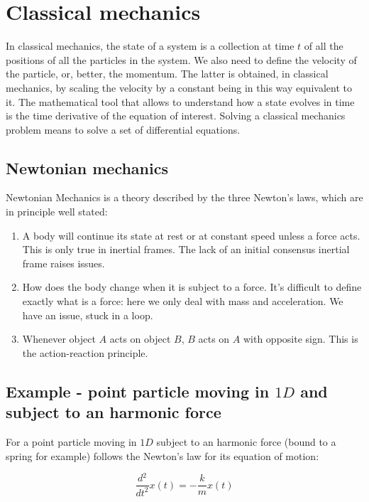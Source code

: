 \section{Classical mechanics}
In classical mechanics, the state of a system is a collection at time $t$ of all the positions of all the particles in the system.
We also need to define the velocity of the particle, or, better, the momentum.
The latter is obtained, in classical mechanics, by scaling the velocity by a constant being in this way equivalent to it.
The mathematical tool that allows to understand how a state evolves in time is the time derivative of the equation of interest.
Solving a classical mechanics problem means to solve a set of differential equations.

  \subsection{Newtonian mechanics}
  Newtonian Mechanics is a theory described by the three Newton's laws, which are in principle well stated:

  \begin{multicols}{2}
    \begin{enumerate}
      \item A body will continue its state at rest or at constant speed unless a force acts.
        This is only true in inertial frames.
        The lack of an initial consensus inertial frame raises issues.
      \item How does the body change when it is subject to a force.
        It's difficult to define exactly what is a force: here we only deal with mass and acceleration.
        We have an issue, stuck in a loop.
      \item Whenever object $A$ acts on object $B$, $B$ acts on $A$ with opposite sign.
        This is the action-reaction principle.
    \end{enumerate}
  \end{multicols}


  \subsection{Example - point particle moving in $1D$ and subject to an harmonic force}
  For a point particle moving in $1D$ subject to an harmonic force (bound to a spring for example) follows the Newton's law for its equation of motion:

  $$\frac{d{^2}}{d{t^2}}x(t) = -\frac{k}{m}x(t)$$

